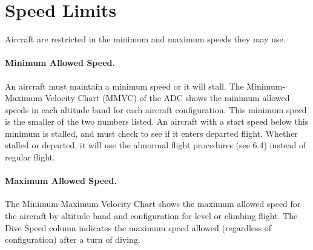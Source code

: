 

\section{Speed Limits}
\label{rule:speed-limits}

Aircraft are restricted in the minimum and maximum speeds they may use.

\paragraph{Minimum Allowed Speed.} 
An aircraft must maintain a minimum speed or it will stall. The Minimum-Maximum Velocity Chart (MMVC) of the ADC shows the minimum allowed speeds in each altitude band for each aircraft configuration. This minimum speed is the smaller of the two numbers listed. An aircraft with a start speed below this minimum is stalled, and must check to see if it enters departed flight. Whether stalled or departed, it will use the abnormal flight procedures (see 6.4) instead of regular flight.

\paragraph{Maximum Allowed Speed.} The Minimum-Maximum Velocity Chart shows the maximum allowed speed for the aircraft by altitude band and configuration for level or climbing flight. The Dive Speed column indicates the maximum speed allowed (regardless of configuration) after a turn of diving.


